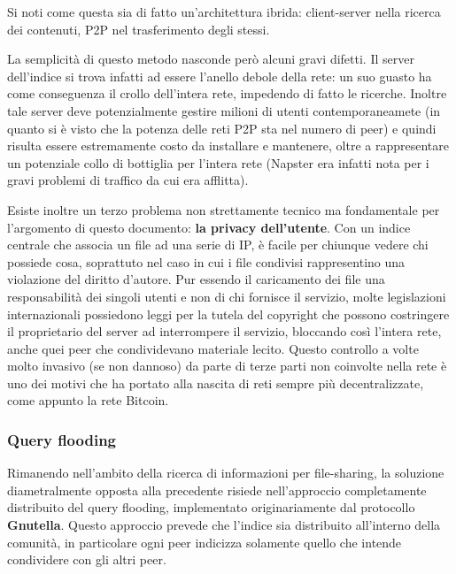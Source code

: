 Si noti come questa sia di fatto un'architettura ibrida: client-server nella ricerca dei contenuti, P2P nel trasferimento degli stessi.

La semplicità di questo metodo nasconde però alcuni gravi difetti. Il server dell'indice si trova infatti ad essere l'anello debole della rete: un suo guasto ha come conseguenza il crollo dell'intera rete, impedendo di fatto le ricerche. Inoltre tale server deve potenzialmente gestire milioni di utenti contemporaneamete (in quanto si è visto che la potenza delle reti P2P sta nel numero di peer) e quindi risulta essere estremamente costo da installare e mantenere, oltre a rappresentare un potenziale collo di bottiglia per l'intera rete (Napster era infatti nota per i gravi problemi di traffico da cui era afflitta).

Esiste inoltre un terzo problema non strettamente tecnico ma fondamentale per l'argomento di questo documento: \textbf{la privacy dell'utente}. Con un indice centrale che associa un file ad una serie di IP, è facile per chiunque vedere chi possiede cosa, soprattuto nel caso in cui i file condivisi rappresentino una violazione del diritto d'autore. Pur essendo il caricamento dei file una responsabilità dei singoli utenti e non di chi fornisce il servizio, molte legislazioni internazionali possiedono leggi per la tutela del copyright che possono costringere il proprietario del server ad interrompere il servizio, bloccando così l'intera rete, anche quei peer che condividevano materiale lecito. Questo controllo a volte molto invasivo (se non dannoso) da parte di terze parti non coinvolte nella rete è uno dei motivi che ha portato alla nascita di reti sempre più decentralizzate, come appunto la rete Bitcoin.

\subsubsection{Query flooding}\label{query-flooding}
 Rimanendo nell'ambito della ricerca di informazioni per file-sharing, la soluzione diametralmente opposta alla precedente risiede nell'approccio completamente distribuito del query flooding, implementato originariamente dal protocollo \textbf{Gnutella}. Questo approccio prevede che l'indice sia distribuito all'interno della comunità, in particolare ogni peer indicizza solamente quello che intende condividere con gli altri peer.

